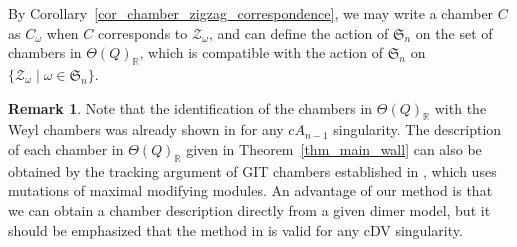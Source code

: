 \documentclass[10pt,a4paper]{amsart}
\numberwithin{equation}{section}
\theoremstyle{definition}
\newtheorem{Remark}[Theorem]{Remark}
\newcommand{\RR}{\mathbb{R}}
\newcommand{\calZ}{\mathcal{Z}}
\newcommand{\fkS}{\mathfrak{S}}
\newcommand{\permII}{\omega}
\begin{document}
By Corollary~\ref{cor_chamber_zigzag_correspondence}, we may write a chamber $C$ as $C_\permII$ when $C$ corresponds to $\calZ_\permII$,
and can define the action of $\fkS_n$ on the set of chambers in $\Theta(Q)_\RR$, which is compatible with the action of $\fkS_n$ on $\{\calZ_\permII \mid \permII\in\fkS_n\}$.

\begin{Remark}
\label{rem_homMMP}
Note that the identification of the chambers in $\Theta(Q)_\RR$ with the Weyl chambers was already shown in \cite[Lemma~6.8]{Wem_MMP}
for any $cA_{n-1}$ singularity.
The description of each chamber in $\Theta(Q)_\RR$ given in Theorem~\ref{thm_main_wall} can also be obtained by the tracking argument of
GIT chambers established in \cite[Section~5]{Wem_MMP}, which uses mutations of maximal modifying modules.
An advantage of our method is that we can obtain a chamber description directly from a given dimer model,
but it should be emphasized that the method in \cite{Wem_MMP} is valid for any cDV singularity.
\end{Remark}
\end{document}
